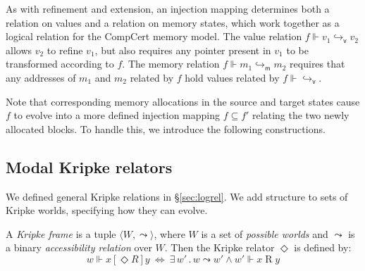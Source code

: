 \documentclass[sigplan,screen,review]{acmart}
\newcommand{\kw}[1]{\ensuremath{ \mathsf{#1} }}
\newcommand{\ifr}[1]{\mathrel{[{#1}]}}
\begin{document}
As with refinement and extension,
an injection mapping determines both
a relation on values and
a relation on memory states,
which work together
as a logical relation for the CompCert memory model.
The value relation $f \Vdash v_1 \hookrightarrow_\kw{v} v_2$
allows $v_2$ to refine $v_1$,
but also requires any pointer present in $v_1$
to be transformed according to $f$.
The memory relation $f \Vdash m_1 \hookrightarrow_\kw{m} m_2$
requires that any addresses of $m_1$ and $m_2$ related by $f$
hold values related by $f \Vdash {\hookrightarrow_\kw{v}}$.

Note that corresponding memory allocations
in the source and target states cause $f$ to
evolve into a more defined injection mapping $f \subseteq f'$
relating the two newly allocated blocks.
To handle this,
we introduce the following constructions.


\subsection{Modal Kripke relators} %

We defined general Kripke relations in \S\ref{sec:logrel}.
We add structure to sets of Kripke worlds,
specifying how they can evolve.

\begin{definition} %
A \emph{Kripke frame} is a tuple
$\langle W, {\leadsto} \rangle$, where
$W$ is a set of \emph{possible worlds} and
$\leadsto$ is a
binary \emph{accessibility relation} over $W$.
Then the Kripke relator $\Diamond$ is defined by:
\[
  w \Vdash x \ifr{\Diamond R} y \: \Leftrightarrow \:
    \exists \, w' \,.\, w \leadsto w' \wedge
      w' \Vdash x \mathrel{R} y
\]
\end{definition}
\end{document}
